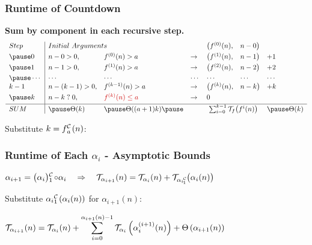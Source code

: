 \begin{frame}
\frametitle{Runtime of Countdown}

\textbf{Sum by component in each recursive step.}
\begin{equation*}
\begin{array}{l|llllll}
Step & \multicolumn{2}{l}{Initial \ Arguments} &  & \big(f^{(0)}(n), & n - 0 \big) &  \\[3pt]
\pause 0    & n - 0 > 0,     & f^{(0)}(n) > a & \to & \big(f^{(1)}(n), & n - 1\big) & + 1 \\[3pt]
\pause 1    & n - 1 > 0, & f^{(1)}(n) > a & \to & \big(f^{(2)}(n), & n - 2\big) & + 2 \\[3pt]
\pause \cdots & \cdots & \cdots & \cdots & \cdots & \cdots & \cdots \\
k-1  & n - (k-1) > 0, & f^{(k-1)}(n) > a & \to & \big(f^{(k)}(n), & n - k\big) & + k \\[3pt]
\pause k & n - k \mathrel{?} 0, & {\color{red} f^{(k)}(n) \le a}  &\to & \multicolumn{2}{l}{0} &  \\[3pt] \hline
SUM & \pause \Theta(k) & \pause \Theta((a+1)k) \pause & &  \multicolumn{2}{c}{\sum_{i=0}^{k-1}\runtime_f\big(f^{i}(n)\big)} & \pause \Theta(k)
\end{array}
\end{equation*}


\pause
Substitute $k = \cdt{f}{a}(n)$:
\end{frame}



\begin{frame}
\frametitle{Runtime of Each $\alpha_i$ - Asymptotic Bounds}

$\displaystyle
\alpha_{i+1} = \cdt{\big(\alpha_i\big)}{1}\circ \alpha_i
\quad \implies \quad \runtime_{\alpha_{i+1}}(n) = \runtime_{\alpha_i}(n) + \runtime_{\cdt{\alpha_i}{1}}\big(\alpha_i(n)\big)
$

\smallskip
\pause 
{}

\bigskip

\pause 
Substitute $\cdt{\alpha_i}{1}(\alpha_i(n))$ for $\alpha_{i+1}(n)$:
\bigskip

$ \displaystyle 
\mathcal{T}_{\alpha_{i+1}}(n)
  = \mathcal{T}_{\alpha_i}(n) + 
  \sum_{i=0}^{\alpha_{i+1}(n) - 1} \mathcal{T}_{\alpha_i}\left(\alpha_i^{(i+1)}(n)\right) + \Theta\left(\alpha_{i+1}(n) \right)
$

\pause 
\smallskip
{}

\end{frame}


